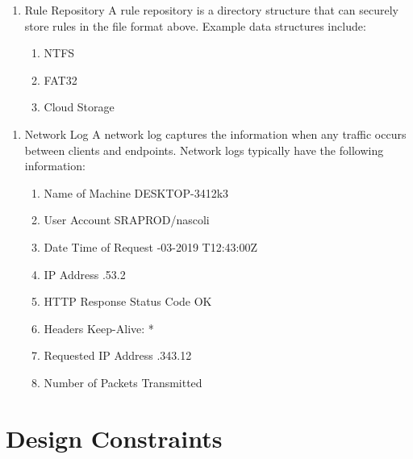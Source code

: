 \documentclass{scrreprt}
\begin{document}
\begin{enumerate}[resume*]
    \item Rule Repository
	\subitem A rule repository is a directory structure that can securely store rules in the file format above. Example data structures include: 
    \begin{enumerate}[label*=\arabic*.]
	\item NTFS
	\item FAT32
	\item Cloud Storage
\end{enumerate}
\end{enumerate}

\begin{enumerate}[resume*]
    \item Network Log
	\subitem A network log captures the information when any traffic occurs between clients and endpoints. Network logs typically have the following information:
    \begin{enumerate}[label*=\arabic*.]
	\item Name of Machine
		\subitem DESKTOP-3412k3
	\item User Account
		\subitem SRAPROD/nascoli
	\item Date Time of Request
		-03-2019 T12:43:00Z
	\item IP Address
		.53.2
	\item HTTP Response Status Code
		 OK
	\item Headers
		\subitem Keep-Alive: *
	\item Requested IP Address
		.343.12
	\item Number of Packets Transmitted

\end{enumerate}
\end{enumerate}

\section{Design Constraints}
\end{document}
